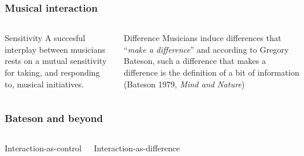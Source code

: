 \documentclass[]{beamer}
\begin{document}
\begin{frame}
  \frametitle{Musical interaction}
  \begin{block}{}
    \begin{columns}[t]
      \begin{block}{Sensitivity}
        A succesful interplay between musicians rests on a mutual sensitivity
        for taking, and responding to, musical initiatives.
      \end{block}
      \pause[2] 
      \begin{block}{Difference}
          Musicians induce differences that ``\emph{make a difference}'' and
          according to Gregory Bateson, such a difference that makes a
          difference is the definition of a bit of information (Bateson 1979, \emph{Mind and Nature})
      \end{block}
    \end{columns}
  \end{block}
\end{frame}

\begin{frame}
  \frametitle{Bateson and beyond}
  \begin{block}{}
    \begin{columns}[t]
      \begin{block}{Interaction-as-control}
      \end{block}
      \begin{block}{Interaction-as-difference}
      \end{block}
    \end{columns}
    \vspace{1cm}
  \end{block}
\end{frame}
\end{document}
